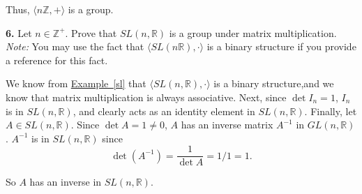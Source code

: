 \documentclass[10pt,]{book}
\theoremstyle{plain}
\theoremstyle{definition}
\theoremstyle{definition}
\theoremstyle{definition}
\theoremstyle{definition}
\numberwithin{equation}{section}
\def\Z{\mathbb{Z}}
\def\R{\mathbb{R}}
\begin{document}
      Thus, \(\langle n\Z, +\rangle\) is a group.
\par\smallskip
\noindent\textbf{6.}\quad{}
        Let \(n\in \Z^+\). Prove that \(SL(n,\R)\) is a group under matrix multiplication.
        \emph{Note:} You may use the fact that \(\langle SL(n\R),\cdot\rangle\) is a binary structure if you provide a reference for this fact.
\par\smallskip

      We know from \hyperref[sl]{Example~\ref{sl}} that \(\langle SL(n,\R),\cdot\rangle\) is a binary structure,and we know that matrix multiplication is always associative. Next, since \(\det I_n=1\), \(I_n\) is in \(SL(n,\R)\), and clearly acts as an identity element in \(SL(n,\R)\). Finally, let \(A\in SL(n,\R)\).  Since \(\det A=1\neq 0\), \(A\) has an inverse matrix \(A^{-1}\) in \(GL(n, \R)\).  \(A^{-1}\) is in \(SL(n,\R)\) since
\begin{equation*}

              \det(A^{-1})=\frac{1}{\det A}=1/1=1.
            
\end{equation*}

            So \(A\) has an inverse in \(SL(n,\R)\).
\par
\end{document}
